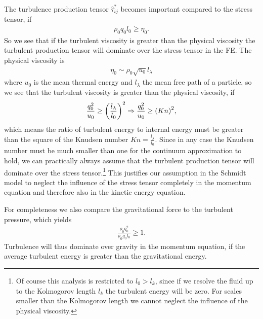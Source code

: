 The turbulence production tensor $\hat{\tau}^*_{ij}$
becomes important compared to the stress tensor, if
\begin{align}
\rho_0 q_0 l_0 \geq \eta_0.
\end{align}
So we see that if the turbulent viscosity is greater than the physical
viscosity the turbulent production tensor will dominate over the stress tensor 
in the FE. The physical viscosity is
\begin{align}
\eta_0 \sim \rho_0 \sqrt{u_0} l_{\lambda}
\end{align}
where $u_0$ is the mean thermal energy and $l_{\lambda}$ the mean free path of
a particle, so we see that the turbulent viscosity is greater than the
physical viscosity, if
\begin{align}
\frac{q_0^2}{u_0} \geq { \left( \frac{l_{\lambda}}{l_0} \right) }^2 \Rightarrow
\frac{q_0^2}{u_0} \geq { \left( Kn \right) }^2,
\end{align}
which means the ratio of turbulent energy to internal energy must be greater
than the square of the Knudsen number $Kn=\frac{l_{\lambda}}{l_0}$. Since 
in any case the Knudsen number must be much smaller than one for the continuum
approximation to hold, we can practically always assume that the turbulent
production tensor will dominate over the stress tensor.\footnote{Of course this
analysis is restricted to $l_0 > l_k$, since if we resolve the fluid up to the
Kolmogorov length $l_k$ the turbulent energy will be zero. For scales smaller
than the Kolmogorov length we cannot neglect the influence of the physical 
viscosity.} This justifies our
assumption in the Schmidt model to neglect the influence of the stress tensor
completely in the momentum equation and therefore also in the kinetic energy
equation.

For completeness we also compare the gravitational force to the turbulent
pressure, which yields
\begin{align}
\frac{\rho_0 q_0^2}{\rho_0 g_0 l_0} \geq 1. 
\end{align}
Turbulence will thus dominate over gravity in the momentum equation, if the
average turbulent energy is greater than the gravitational energy. 

